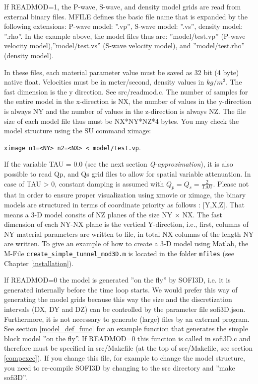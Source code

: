 \documentclass[11pt,onecolumn,oneside]{article}
\begin{document}
If READMOD=1, the P-wave, S-wave, and density model grids are read from external binary files. MFILE defines the basic file name that is expanded by the following extensions: P-wave model: ''.vp'', S-wave model: ''.vs'', density model: ''.rho''.  In the example above, the model files thus are: ''model/test.vp'' (P-wave velocity model),''model/test.vs'' (S-wave velocity model), and ''model/test.rho'' (density model). 

In these files, each material parameter value must be saved as 32 bit (4 byte) native float. Velocities must be in meter/second, density values in $kg/m^3$. The fast dimension is the y direction. See src/readmod.c. The number of samples for the entire model in the x-direction is NX, the number of values in the y-direction is always NY  and the number of values in the z-direction is always NZ. The file size of each model file thus must be NX*NY*NZ*4 bytes. You may check the model structure using the SU command ximage:

\lstinline {ximage n1=<NY> n2=<NX> < model/test.vp}.

If the variable TAU = 0.0 (see the next section \textit{Q-approximation}), it is also possible to read Qp, and Qs grid files to allow for spatial variable attenuation. In case of TAU > 0, constant damping is assumed with $Q_p=Q_s = \frac{2}{\mbox{TAU}}$. Please not that in order to ensure proper visualization using xmovie or ximage, the binary models are structured in terms of coordinate priority as follows : [Y,X,Z]. That means a 3-D model consits of NZ planes of the size NY $\times$ NX. The fast dimension of each NY-NX plane is the vertical Y-direction, i.e., first, columns of NY material parameters are written to file, in total NX columns of the length NY are written. To give an example of how to create a 3-D model using Matlab, the M-File  \lstinline{create_simple_tunnel_mod3D.m} is located in the folder  \lstinline{mfiles} (see Chapter \ref{installation}).

If READMOD=0 the model is generated ''on the fly'' by SOFI3D, i.e. it is generated internally before the time loop starts. We would prefer this way of generating the model grids because this way the size and the discretization intervals (DX, DY and DZ) can be controlled by the parameter file sofi3D.json. Furthermore, it is not necessary to generate (large) files by an external program. See section \ref{model_def_func} for an example function that generates the simple block model ''on the fly''. If READMOD=0 this function is called in sofi3D.c and therefore must be specified in src/Makefile (at the top of src/Makefile, see section \ref{compexec}). If you change this file, for example to change the model structure, you need to re-compile SOFI3D by changing to the src directory and ''make sofi3D''.
\end{document}
